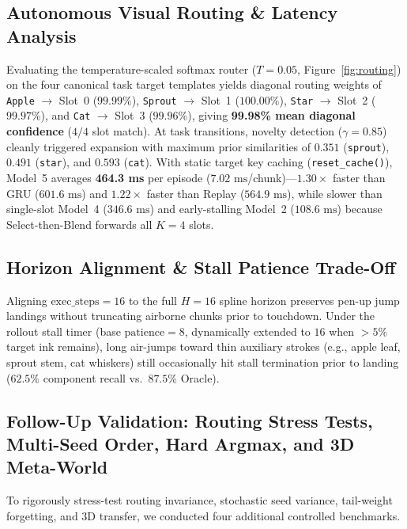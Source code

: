 \documentclass[10pt,twocolumn]{article}
\begin{document}
\subsection{Autonomous Visual Routing \& Latency Analysis}
Evaluating the temperature-scaled softmax router ($T=0.05$, Figure~\ref{fig:routing}) on the four canonical task target templates yields diagonal routing weights of \texttt{Apple} $\rightarrow$ Slot~0 ($99.99\%$), \texttt{Sprout} $\rightarrow$ Slot~1 ($100.00\%$), \texttt{Star} $\rightarrow$ Slot~2 ($99.97\%$), and \texttt{Cat} $\rightarrow$ Slot~3 ($99.96\%$), giving \textbf{99.98\% mean diagonal confidence} ($4/4$ slot match). At task transitions, novelty detection ($\gamma=0.85$) cleanly triggered expansion with maximum prior similarities of $0.351$ (\texttt{sprout}), $0.491$ (\texttt{star}), and $0.593$ (\texttt{cat}). With static target key caching (\texttt{reset\_cache()}), Model~5 averages \textbf{464.3 ms} per episode ($7.02\text{ ms}$/chunk)---$1.30\times$ faster than GRU ($601.6\text{ ms}$) and $1.22\times$ faster than Replay ($564.9\text{ ms}$), while slower than single-slot Model~4 ($346.6\text{ ms}$) and early-stalling Model~2 ($108.6\text{ ms}$) because Select-then-Blend forwards all $K=4$ slots.

\subsection{Horizon Alignment \& Stall Patience Trade-Off}
Aligning $\text{exec\_steps}=16$ to the full $H=16$ spline horizon preserves pen-up jump landings without truncating airborne chunks prior to touchdown. Under the rollout stall timer (base $\text{patience}=8$, dynamically extended to $16$ when $>5\%$ target ink remains), long air-jumps toward thin auxiliary strokes (e.g., apple leaf, sprout stem, cat whiskers) still occasionally hit stall termination prior to landing ($62.5\%$ component recall vs.\ $87.5\%$ Oracle).

\subsection{Follow-Up Validation: Routing Stress Tests, Multi-Seed Order, Hard Argmax, and 3D Meta-World}

To rigorously stress-test routing invariance, stochastic seed variance, tail-weight forgetting, and 3D transfer, we conducted four additional controlled benchmarks.
\end{document}
